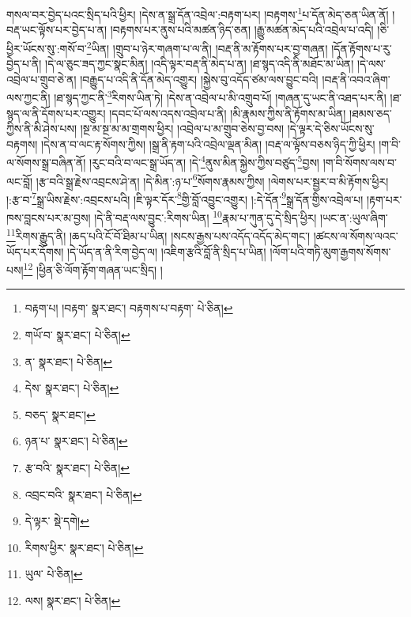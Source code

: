 གསལ་བར་བྱེད་པའང་སྲིད་པའི་ཕྱིར། །དེས་ན་སྒྲ་དོན་འབྲེལ་:བརྟག་པར། །བརྟགས་\footnote{བརྟག་པ། །བརྟག་  སྣར་ཐང་། བརྟགས་པ་བརྟག་  པེ་ཅིན། }པ་དོན་མེད་ཅན་ཡིན་ནོ། །བརྡ་ཡང་ལྟོས་པར་བྱེད་པ་ན། །བརྟགས་པར་ནུས་པའི་མཚན་ཉིད་ཅན། །རྒྱུ་མཚན་མེད་པའི་འབྲེལ་པ་འདི། །ཅི་ཕྱིར་ཡོངས་སུ་:གསོ་བ་\footnote{གཡོ་བ་  སྣར་ཐང་།  པེ་ཅིན། }ཡིན། །གྲུབ་པ་ཉེར་གཞག་པ་ལ་ནི། །བརྡ་ནི་མ་རྟོགས་པར་བྱ་གཞན། །དོན་རྟོགས་པ་རུ་བྱེད་པ་ནི། །དེ་ལ་ཅུང་ཟད་ཀྱང་སྣང་མིན། །འདི་ལྟར་བརྡ་ནི་མེད་པ་ན། །ཐ་སྙད་འདི་ནི་མཐོང་མ་ཡིན། །དེ་ལས་འབྲེལ་པ་གྲུབ་ཅེ་ན། །བརྒྱུད་པ་འདི་ནི་དོན་མེད་འགྱུར། །སྐྱེས་བུ་འདོད་ཙམ་ལས་བྱུང་བའི། །བརྡ་ནི་འབའ་ཞིག་ལས་ཀྱང་ནི། །ཐ་སྙད་ཀྱང་ནི་\footnote{ན་  སྣར་ཐང་།  པེ་ཅིན། }རིགས་ཡིན་ཏེ། །དེས་ན་འབྲེལ་པ་མི་འགྲུབ་པོ། །གཞན་དུ་ཡང་ནི་འཐད་པར་ནི། །ཐ་སྙད་ལ་ནི་དོགས་པར་འགྱུར། །དབང་པོ་ལས་འདས་འབྲེལ་པ་ནི། །མི་རྣམས་ཀྱིས་ནི་རྟོགས་མ་ཡིན། །ཐམས་ཅད་ཀྱིས་ནི་མི་ཤེས་པས། །སྔ་མ་སྔ་མ་མ་གྲགས་ཕྱིར། །འབྲེལ་པ་མ་གྲུབ་ཅེས་བྱ་བས། །དེ་ལྟར་དེ་ཅིས་ཡོངས་སུ་བརྟགས། །དེས་ན་བ་ལང་རྟ་སོགས་ཀྱིས། །སྒྲ་ནི་རྟག་པའི་འབྲེལ་ལྡན་མིན། །བརྡ་ལ་ལྟོས་བཅས་ཉིད་ཀྱི་ཕྱིར། །ག་བི་ལ་སོགས་སྒྲ་བཞིན་ནོ། །རུང་བའི་བ་ལང་སྒྲ་ཡོད་ན། །དེ་\footnote{དེས་  སྣར་ཐང་།  པེ་ཅིན། }ནུས་མིན་སྐྱེས་ཀྱིས་བཙུད་\footnote{བཅད་  སྣར་ཐང་། }བྱས། །ག་བི་སོགས་ལས་བ་ལང་བློ། །རྩ་བའི་སྒྲ་རྗེས་འབྲངས་ཤེ་ན། །དེ་མིན་:ཉ་པ་\footnote{ཉན་པ་  སྣར་ཐང་།  པེ་ཅིན། }སོགས་རྣམས་ཀྱིས། །ལེགས་པར་སྦྱར་བ་མི་རྟོགས་ཕྱིར། །:རྩ་བ་\footnote{རྩ་བའི་  སྣར་ཐང་།  པེ་ཅིན། }སྒྲ་ཡིས་རྗེས་:འབྲངས་པའི། །ཇི་ལྟར་དོར་\footnote{འབྲང་བའི་  སྣར་ཐང་།  པེ་ཅིན། }གྱི་བློ་འབྱུང་འགྱུར། །:དེ་དོན་\footnote{དེ་ལྟར་  སྡེ་དགེ། }སྒྲ་དོན་གྱིས་འབྲེལ་པ། །རྟག་པར་ཁས་བླངས་པར་མ་བྱས། །དེ་ནི་བརྡ་ལས་བྱུང་:རིགས་ཡིན། \footnote{རིགས་ཕྱིར་  སྣར་ཐང་།  པེ་ཅིན། }རྣམ་པ་ཀུན་དུ་དེ་སྲིད་ཕྱིར། །ཡང་ན་:ཡུལ་ཞིག་\footnote{ཡུལ་  པེ་ཅིན། }རིགས་རྒྱུད་ནི། །ཆད་པའི་ངོ་བོ་ཐིམ་པ་ཡིན། །སངས་རྒྱས་པས་འདོད་འདོད་མེད་གང་། །ཚངས་ལ་སོགས་ལའང་ཡོད་པར་དོགས། །དེ་ཡོད་ན་ནི་རིག་བྱེད་ལ། །འཇིག་རྩའི་བློ་ནི་སྲིད་པ་ཡིན། །ལོག་པའི་གཏི་མུག་རྒྱགས་སོགས་པས།\footnote{ལས།  སྣར་ཐང་།  པེ་ཅིན། } །ཕྱིན་ཅི་ལོག་རྟོག་གཞན་ཡང་སྲིད། །
